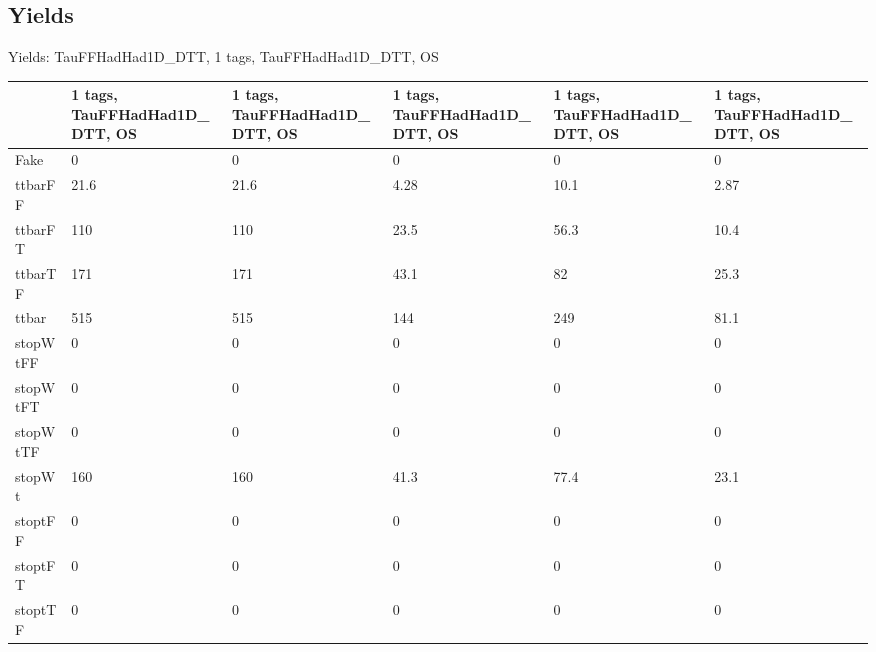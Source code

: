 
\subsection{Yields}

\begin{frame}{Yields: TauFFHadHad1D\_DTT, 1 tags, TauFFHadHad1D\_DTT, OS}
\begin{center}
  \begin{tabular}{l| >{\centering\let\newline\\\arraybackslash\hspace{0pt}}m{1.4cm}| >{\centering\let\newline\\\arraybackslash\hspace{0pt}}m{1.4cm}| >{\centering\let\newline\\\arraybackslash\hspace{0pt}}m{1.4cm}| >{\centering\let\newline\\\arraybackslash\hspace{0pt}}m{1.4cm}| >{\centering\let\newline\\\arraybackslash\hspace{0pt}}m{1.4cm}}
    & 1 tags, TauFFHadHad1D\_DTT, OS & 1 tags, TauFFHadHad1D\_DTT, OS & 1 tags, TauFFHadHad1D\_DTT, OS & 1 tags, TauFFHadHad1D\_DTT, OS & 1 tags, TauFFHadHad1D\_DTT, OS \\
 \hline \hline
    Fake& 0 & 0 & 0 & 0 & 0 \\
 \hline
    ttbarFF& 21.6 & 21.6 & 4.28 & 10.1 & 2.87 \\
 \hline
    ttbarFT& 110 & 110 & 23.5 & 56.3 & 10.4 \\
 \hline
    ttbarTF& 171 & 171 & 43.1 & 82 & 25.3 \\
 \hline
    ttbar& 515 & 515 & 144 & 249 & 81.1 \\
 \hline
    stopWtFF& 0 & 0 & 0 & 0 & 0 \\
 \hline
    stopWtFT& 0 & 0 & 0 & 0 & 0 \\
 \hline
    stopWtTF& 0 & 0 & 0 & 0 & 0 \\
 \hline
    stopWt& 160 & 160 & 41.3 & 77.4 & 23.1 \\
 \hline
    stoptFF& 0 & 0 & 0 & 0 & 0 \\
 \hline
    stoptFT& 0 & 0 & 0 & 0 & 0 \\
 \hline
    stoptTF& 0 & 0 & 0 & 0 & 0 \\

\end{tabular}
\end{center}
\end{frame}
